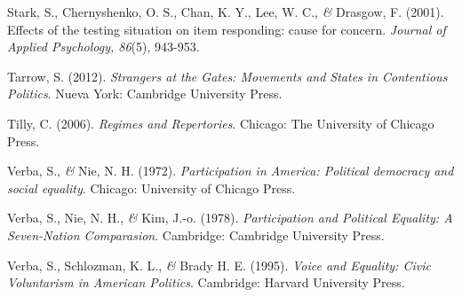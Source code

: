 \documentclass[a4paper]{tufte-handout}
\begin{document}
\begin{list}{}
\item{\small Stark, S., Chernyshenko, O. S., Chan, K. Y., Lee, W. C., {\itshape \&} Drasgow, F. (2001). Effects of the testing situation on item responding: cause for concern. {\itshape Journal of Applied Psychology, 86}(5), 943-953.}

\item{\small Tarrow, S. (2012). {\itshape Strangers at the Gates: Movements and States in Contentious Politics}. Nueva York: Cambridge University Press.}

\item{\small Tilly, C. (2006). {\itshape Regimes and Repertories}. Chicago: The University of Chicago Press.}

\item{\small Verba, S., {\itshape \&} Nie, N. H. (1972). {\itshape Participation in America: Political democracy and social equality}. Chicago: University of Chicago Press.}

\item{\small Verba, S., Nie, N. H., {\itshape \&} Kim, J.-o. (1978). {\itshape Participation and Political Equality: A Seven-Nation Comparasion}. Cambridge: Cambridge University Press.}

\item{\small Verba, S., Schlozman, K. L., {\itshape \&} Brady H. E. (1995). {\itshape Voice and Equality: Civic Voluntarism in American Politics}. Cambridge: Harvard University Press.}

\end{list}

\end{document}
